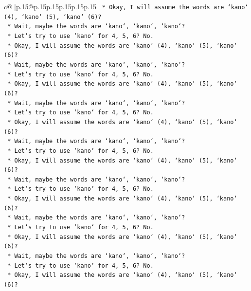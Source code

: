 \documentclass{article}
\begin{document}
{\begin{supertabular}{c@{$\;$}|p{.15\linewidth}@{}p{.15\linewidth}p{.15\linewidth}p{.15\linewidth}p{.15\linewidth}p{.15\linewidth}}
{{{\texttt{        *   Okay, I will assume the words are `kano` (4), `kano` (5), `kano` (6)?} \\
\texttt{        *   Wait, maybe the words are `kano`, `kano`, `kano`?} \\
\texttt{        *   Let's try to use `kano` for 4, 5, 6? No.} \\
\texttt{        *   Okay, I will assume the words are `kano` (4), `kano` (5), `kano` (6)?} \\
\texttt{        *   Wait, maybe the words are `kano`, `kano`, `kano`?} \\
\texttt{        *   Let's try to use `kano` for 4, 5, 6? No.} \\
\texttt{        *   Okay, I will assume the words are `kano` (4), `kano` (5), `kano` (6)?} \\
\texttt{        *   Wait, maybe the words are `kano`, `kano`, `kano`?} \\
\texttt{        *   Let's try to use `kano` for 4, 5, 6? No.} \\
\texttt{        *   Okay, I will assume the words are `kano` (4), `kano` (5), `kano` (6)?} \\
\texttt{        *   Wait, maybe the words are `kano`, `kano`, `kano`?} \\
\texttt{        *   Let's try to use `kano` for 4, 5, 6? No.} \\
\texttt{        *   Okay, I will assume the words are `kano` (4), `kano` (5), `kano` (6)?} \\
\texttt{        *   Wait, maybe the words are `kano`, `kano`, `kano`?} \\
\texttt{        *   Let's try to use `kano` for 4, 5, 6? No.} \\
\texttt{        *   Okay, I will assume the words are `kano` (4), `kano` (5), `kano` (6)?} \\
\texttt{        *   Wait, maybe the words are `kano`, `kano`, `kano`?} \\
\texttt{        *   Let's try to use `kano` for 4, 5, 6? No.} \\
\texttt{        *   Okay, I will assume the words are `kano` (4), `kano` (5), `kano` (6)?} \\
\texttt{        *   Wait, maybe the words are `kano`, `kano`, `kano`?} \\
\texttt{        *   Let's try to use `kano` for 4, 5, 6? No.} \\
\texttt{        *   Okay, I will assume the words are `kano` (4), `kano` (5), `kano` (6)?} \\
}}}
\end{supertabular}}
\end{document}
